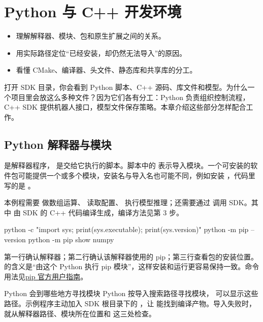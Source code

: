 \chapter{Python 与 C++ 开发环境}
\label{chap:python-build}
\begin{intro}
\begin{itemize}
\item 理解解释器、模块、包和原生扩展之间的关系。
\item 用实际路径定位“已经安装，却仍然无法导入”的原因。
\item 看懂 CMake、编译器、头文件、静态库和共享库的分工。
\end{itemize}
\end{intro}

打开 SDK 目录，你会看到 Python 脚本、C++ 源码、库文件和模型。为什么一个项目里会放这么多种文件？因为它们各有分工：Python 负责组织控制流程，C++ SDK 提供机器人接口，模型文件保存策略。本章介绍这些部分怎样配合工作。

\section{Python 解释器与模块}
 是解释器程序， 是交给它执行的脚本。脚本中的  表示导入模块。一个可安装的软件包可能提供一个或多个模块，安装名与导入名也可能不同，例如安装 ，代码里写的是 。

本例程需要  做数组运算、 读取配置、 执行模型推理；还需要通过  调用 SDK。其中  由 SDK 的 C++ 代码编译生成，编译方法见第 3 步。

\begin{command}
python -c "import sys; print(sys.executable); print(sys.version)"
python -m pip --version
python -m pip show numpy
\end{command}
第一行确认解释器；第二行确认该解释器使用的 pip；第三行查看包的安装位置。 的含义是“由这个 Python 执行 pip 模块”，这样安装和运行更容易保持一致。命令用法见\href{https://pip.pypa.io/en/stable/user_guide/}{pip 官方用户指南}。

\begin{concept}{Python 会到哪些地方寻找模块}
Python 按导入搜索路径寻找模块， 可以显示这些路径。示例程序主动加入 SDK 根目录下的 ，让  能找到编译产物。导入失败时，就从解释器路径、模块所在位置和  这三处检查。
\end{concept}


